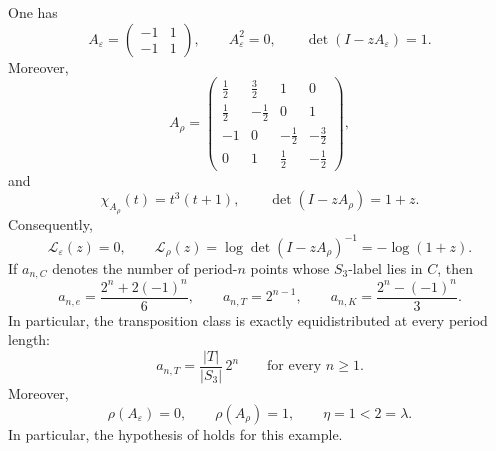 \begin{proposition}
  \label{prop:s3-example-channels}
  One has
  \begin{equation}\label{eq:s3-example-aeps}
    A_\varepsilon=
    \begin{pmatrix}
      -1 & 1 \\
      -1 & 1
    \end{pmatrix},
    \qquad
    A_\varepsilon^2=0,
    \qquad
    \det(I-zA_\varepsilon)=1.
  \end{equation}
  Moreover,
  \begin{equation}\label{eq:s3-example-arho}
    A_\rho=
    \begin{pmatrix}
      \frac12 & \frac32 & 1 & 0 \\
      \frac12 & -\frac12 & 0 & 1 \\
      -1 & 0 & -\frac12 & -\frac32 \\
      0 & 1 & \frac12 & -\frac12
    \end{pmatrix},
  \end{equation}
  and
  \begin{equation}\label{eq:s3-example-arho-charpoly}
    \chi_{A_\rho}(t)=t^3(t+1),
    \qquad
    \det(I-zA_\rho)=1+z.
  \end{equation}
  Consequently,
  \begin{equation}\label{eq:s3-example-logarithms}
    \mathcal L_\varepsilon(z)=0,
    \qquad
    \mathcal L_\rho(z)=\log\det(I-zA_\rho)^{-1}=-\log(1+z).
  \end{equation}
  If \(a_{n,C}\) denotes the number of period-\(n\) points whose
  \(S_3\)-label lies in \(C\), then
  \begin{equation}\label{eq:s3-example-periodic-classes}
    a_{n,e}=\frac{2^n+2(-1)^n}{6},
    \qquad
    a_{n,T}=2^{n-1},
    \qquad
    a_{n,K}=\frac{2^n-(-1)^n}{3}.
  \end{equation}
  In particular, the transposition class is exactly equidistributed at
  every period length:
  \begin{equation}\label{eq:s3-example-periodic-equidistribution}
    a_{n,T}=\frac{|T|}{|S_3|}\,2^n
    \qquad \text{for every } n\ge 1.
  \end{equation}
  Moreover,
  \begin{equation}\label{eq:s3-example-eta-check}
    \rho(A_\varepsilon)=0,
    \qquad
    \rho(A_\rho)=1,
    \qquad
    \eta=1<2=\lambda.
  \end{equation}
  In particular, the hypothesis of
   holds for this example.
\end{proposition}

